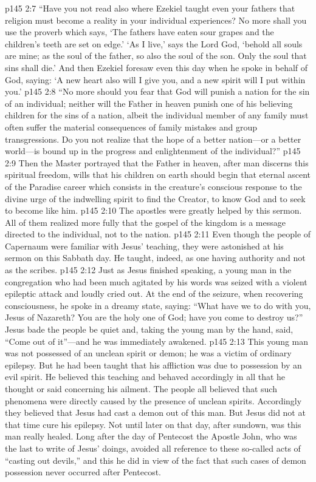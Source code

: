 \vs p145 2:7 \textcolor{ubdarkred}{“Have you not read also where Ezekiel taught even your fathers that religion must become a reality in your individual experiences? No more shall you use the proverb which says, ‘The fathers have eaten sour grapes and the children’s teeth are set on edge.’ ‘As I live,’ says the Lord God, ‘behold all souls are mine; as the soul of the father, so also the soul of the son. Only the soul that sins shall die.’ And then Ezekiel foresaw even this day when he spoke in behalf of God, saying: ‘A new heart also will I give you, and a new spirit will I put within you.’}
\vs p145 2:8 \textcolor{ubdarkred}{“No more should you fear that God will punish a nation for the sin of an individual; neither will the Father in heaven punish one of his believing children for the sins of a nation, albeit the individual member of any family must often suffer the material consequences of family mistakes and group transgressions. Do you not realize that the hope of a better nation---or a better world---is bound up in the progress and enlightenment of the individual?”}
\vs p145 2:9 Then the Master portrayed that the Father in heaven, after man discerns this spiritual freedom, wills that his children on earth should begin that eternal ascent of the Paradise career which consists in the creature’s conscious response to the divine urge of the indwelling spirit to find the Creator, to know God and to seek to become like him.
\pc \vs p145 2:10 The apostles were greatly helped by this sermon. All of them realized more fully that the gospel of the kingdom is a message directed to the individual, not to the nation.
\vs p145 2:11 Even though the people of Capernaum were familiar with Jesus’ teaching, they were astonished at his sermon on this Sabbath day. He taught, indeed, as one having authority and not as the scribes.
\pc \vs p145 2:12 Just as Jesus finished speaking, a young man in the congregation who had been much agitated by his words was seized with a violent epileptic attack and loudly cried out. At the end of the seizure, when recovering consciousness, he spoke in a dreamy state, saying: “What have we to do with you, Jesus of Nazareth? You are the holy one of God; have you come to destroy us?” Jesus bade the people be quiet and, taking the young man by the hand, said, \textcolor{ubdarkred}{“Come out of it”}---and he was immediately awakened.
\vs p145 2:13 This young man was not possessed of an unclean spirit or demon; he was a victim of ordinary epilepsy. But he had been taught that his affliction was due to possession by an evil spirit. He believed this teaching and behaved accordingly in all that he thought or said concerning his ailment. The people all believed that such phenomena were directly caused by the presence of unclean spirits. Accordingly they believed that Jesus had cast a demon out of this man. But Jesus did not at that time cure his epilepsy. Not until later on that day, after sundown, was this man really healed. Long after the day of Pentecost the Apostle John, who was the last to write of Jesus’ doings, avoided all reference to these so\hyp{}called acts of “casting out devils,” and this he did in view of the fact that such cases of demon possession never occurred after Pentecost.
